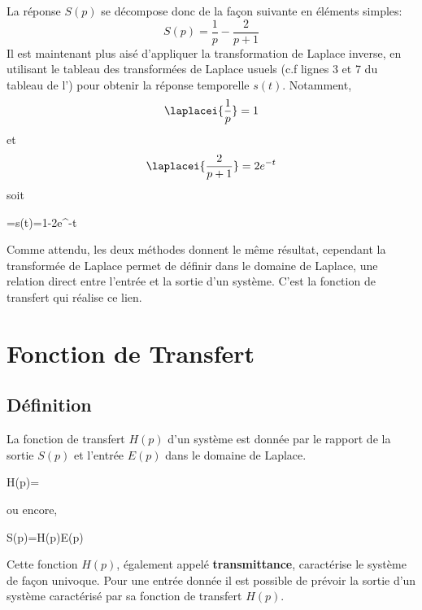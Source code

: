La réponse $S(p)$ se décompose donc de la façon suivante en éléments simples:
\[
    S(p)=\dfrac{1}{p}-\dfrac{2}{p+1}
\]
Il est maintenant plus aisé d'appliquer la transformation de Laplace inverse, 
en utilisant le tableau des transformées de Laplace usuels 
(c.f lignes 3 et 7 du tableau de l') pour obtenir la 
réponse temporelle $s(t)$. Notamment,
\[
    \laplacei{\dfrac{1}{p}}=1
\]
et
\[
    \laplacei{\dfrac{2}{p+1}}=2e^{-t}
\]
soit 
\begin{bequation}
    =s(t)=1-2e^{-t}
\end{bequation}
Comme attendu, les deux méthodes donnent le même résultat, cependant 
la transformée de Laplace permet de définir dans le domaine de Laplace, une 
relation direct entre l'entrée et la sortie d'un système. C'est la fonction 
de transfert qui réalise ce lien.
\section{Fonction de Transfert}
\subsection{Définition}
La fonction de transfert $H(p)$ d'un système est donnée par le rapport de la 
sortie $S(p)$ et l'entrée $E(p)$ dans le domaine de Laplace. 
\begin{bequation}
    H(p)=
\end{bequation}
ou encore,
\begin{bequation}
    S(p)=H(p)E(p)\label{eq-she}
\end{bequation}
Cette fonction $H(p)$, également appelé \textbf{transmittance}, caractérise 
le système de façon univoque. Pour une entrée donnée il est possible de 
prévoir la sortie d'un système caractérisé par sa fonction de transfert $H(p)$.

